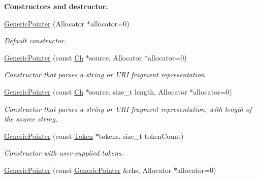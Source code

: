\begin{Indent}{\bf Constructors and destructor.}\par
\begin{DoxyCompactItemize}
\item 
\hyperlink{class_generic_pointer_a5d85b7dc82719643e8f7adccd5a74fbe}{Generic\+Pointer} (Allocator $\ast$allocator=0)\hypertarget{class_generic_pointer_a5d85b7dc82719643e8f7adccd5a74fbe}{}\label{class_generic_pointer_a5d85b7dc82719643e8f7adccd5a74fbe}

\begin{DoxyCompactList}\small\item\em Default constructor. \end{DoxyCompactList}\item 
\hyperlink{class_generic_pointer_a4ad549b8a826c3c2dedf03fcc07be9b0}{Generic\+Pointer} (const \hyperlink{class_generic_pointer_ab292356c11b4015c98d21b966b11f285}{Ch} $\ast$source, Allocator $\ast$allocator=0)
\begin{DoxyCompactList}\small\item\em Constructor that parses a string or U\+RI fragment representation. \end{DoxyCompactList}\item 
\hyperlink{class_generic_pointer_a9c05684ea95306aac7626e70cb3946cc}{Generic\+Pointer} (const \hyperlink{class_generic_pointer_ab292356c11b4015c98d21b966b11f285}{Ch} $\ast$source, size\+\_\+t length, Allocator $\ast$allocator=0)
\begin{DoxyCompactList}\small\item\em Constructor that parses a string or U\+RI fragment representation, with length of the source string. \end{DoxyCompactList}\item 
\hyperlink{class_generic_pointer_a524a9921eff68f389a817a20ca7f1d84}{Generic\+Pointer} (const \hyperlink{struct_generic_pointer_1_1_token}{Token} $\ast$tokens, size\+\_\+t token\+Count)
\begin{DoxyCompactList}\small\item\em Constructor with user-\/supplied tokens. \end{DoxyCompactList}\item 
\hyperlink{class_generic_pointer_a18d671bb793c6b843d5496b2b130cb70}{Generic\+Pointer} (const \hyperlink{class_generic_pointer}{Generic\+Pointer} \&rhs, Allocator $\ast$allocator=0)\hypertarget{class_generic_pointer_a18d671bb793c6b843d5496b2b130cb70}{}\label{class_generic_pointer_a18d671bb793c6b843d5496b2b130cb70}


\end{DoxyCompactItemize}
\end{Indent}

